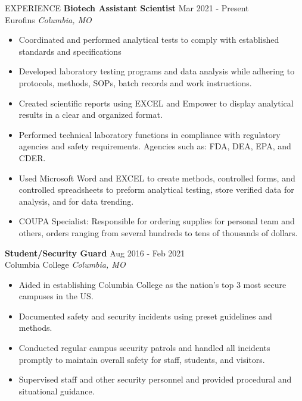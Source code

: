 \documentclass[a4paper,11pt]{article}
\begin{document}
\begin{Section}{EXPERIENCE}
    \textbf{Biotech Assistant Scientist} \hfill Mar 2021 - Present\\
    Eurofins \hfill \textit{Columbia, MO}
        \begin{itemize}
            \itemsep -3pt {} 
                \item {Coordinated and performed analytical tests to comply with established standards and specifications}
                \item {Developed laboratory testing programs and data analysis while adhering to protocols, methods, SOPs, batch records and work instructions.}
                \item {Created scientific reports using EXCEL and Empower to display analytical results in a clear and organized format.}
                \item {Performed technical laboratory functions in compliance with regulatory agencies and safety requirements. Agencies such as: FDA, DEA, EPA, and CDER.}
                \item {Used Microsoft Word and EXCEL to create methods, controlled forms, and controlled spreadsheets to preform analytical testing, store verified data for analysis, and for data trending.}
                \item {COUPA Specialist: Responsible for ordering supplies for personal team and others, orders ranging from several hundreds to tens of thousands of dollars.}
         \end{itemize}

    \textbf{Student/Security Guard} \hfill Aug 2016 - Feb 2021\\
    Columbia College \hfill \textit{Columbia, MO}
        \begin{itemize}
            \itemsep -3pt {} 
                \item {Aided in establishing Columbia College as the nation's top 3 most secure campuses in the US.}
                \item {Documented safety and security incidents using preset guidelines and methods.}
                \item {Conducted regular campus security patrols and handled all incidents promptly to maintain overall safety for staff, students, and visitors.}
                 \item {Supervised staff and other security personnel and provided procedural and situational guidance.}
         \end{itemize}


\end{Section}
\end{document}
